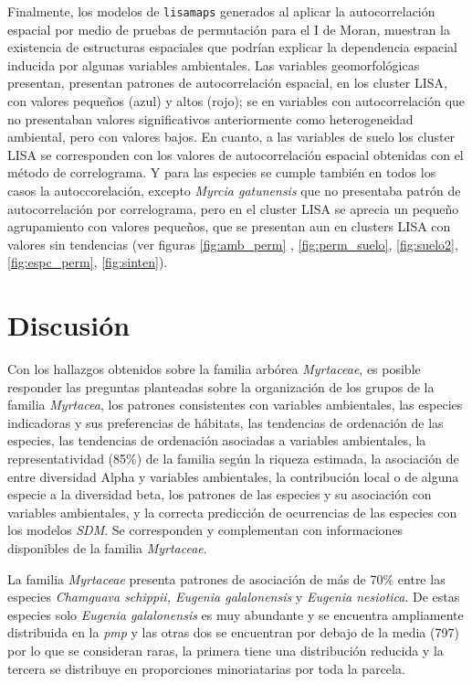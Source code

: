 \documentclass[11pt,]{article}
\begin{document}
Finalmente, los modelos de \texttt{lisamaps} generados al aplicar la
autocorrelación espacial por medio de pruebas de permutación para el I
de Moran, muestran la existencia de estructuras espaciales que podrían
explicar la dependencia espacial inducida por algunas variables
ambientales. Las variables geomorfológicas presentan, presentan patrones
de autocorrelación espacial, en los cluster LISA, con valores pequeños
(azul) y altos (rojo); se en variables con autocorrelación que no
presentaban valores significativos anteriormente como heterogeneidad
ambiental, pero con valores bajos. En cuanto, a las variables de suelo
los cluster LISA se corresponden con los valores de autocorrelación
espacial obtenidas con el método de correlograma. Y para las especies se
cumple también en todos los casos la autoccorelación, excepto
\emph{Myrcia gatunensis} que no presentaba patrón de autocorrelación por
correlograma, pero en el cluster LISA se aprecia un pequeño agrupamiento
con valores pequeños, que se presentan aun en clusters LISA con valores
sin tendencias (ver figuras \ref{fig:amb_perm} , \ref{fig:perm_suelo},
\ref{fig:suelo2}, \ref{fig:espc_perm}, \ref{fig:sinten}).

\section{Discusión}\label{discusiuxf3n}

Con los hallazgos obtenidos sobre la familia arbórea \emph{Myrtaceae},
es posible responder las preguntas planteadas sobre la organización de
los grupos de la familia \emph{Myrtacea}, los patrones consistentes con
variables ambientales, las especies indicadoras y sus preferencias de
hábitats, las tendencias de ordenación de las especies, las tendencias
de ordenación asociadas a variables ambientales, la representatividad
(85\%) de la familia según la riqueza estimada, la asociación de entre
diversidad Alpha y variables ambientales, la contribución local o de
alguna especie a la diversidad beta, los patrones de las especies y su
asociación con variables ambientales, y la correcta predicción de
ocurrencias de las especies con los modelos \emph{SDM}. Se corresponden
y complementan con informaciones disponibles de la familia
\emph{Myrtaceae}.

La familia \emph{Myrtaceae} presenta patrones de asociación de más de
70\% entre las especies \emph{Chamguava schippii, Eugenia galalonensis}
y \emph{Eugenia nesiotica}. De estas especies solo \emph{Eugenia
galalonensis} es muy abundante y se encuentra ampliamente distribuida en
la \emph{pmp} y las otras dos se encuentran por debajo de la media (797)
por lo que se consideran raras, la primera tiene una distribución
reducida y la tercera se distribuye en proporciones minoriatarias por
toda la parcela.
\end{document}
